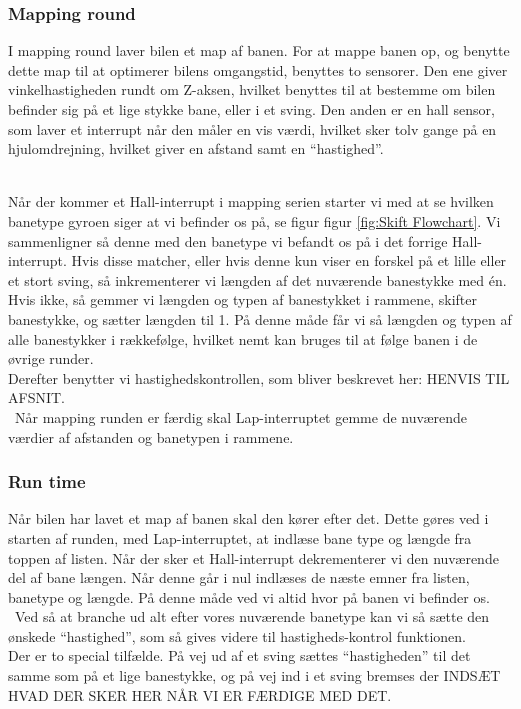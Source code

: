 \subsubsection{Mapping round}
I mapping round laver bilen et map af banen. For at mappe banen op, og benytte dette map til at optimerer bilens omgangstid, benyttes to sensorer. Den ene giver vinkelhastigheden rundt om Z-aksen, hvilket benyttes til at bestemme om bilen befinder sig på et lige stykke bane, eller i et sving. Den anden er en hall sensor, som laver et interrupt når den måler en vis værdi, hvilket sker tolv gange på en hjulomdrejning, hvilket giver en afstand samt en ``hastighed''.
\\\


Når der kommer et Hall-interrupt i mapping serien starter vi med at se hvilken banetype gyroen siger at vi befinder os på, se figur figur \ref{fig:Skift Flowchart}. Vi sammenligner så denne med den banetype vi befandt os på i det forrige Hall-interrupt. Hvis disse matcher, eller hvis denne kun viser en forskel på et lille eller et stort sving, så inkrementerer vi længden af det nuværende banestykke med én. Hvis ikke, så gemmer vi længden og typen af banestykket i rammene, skifter banestykke, og sætter længden til 1. På denne måde får vi så længden og typen af alle banestykker i rækkefølge, hvilket nemt kan bruges til at følge banen i de øvrige runder.
\\
Derefter benytter vi hastighedskontrollen, som bliver beskrevet her: HENVIS TIL AFSNIT.
\\\
Når mapping runden er færdig skal Lap-interruptet gemme de nuværende værdier af afstanden og banetypen i rammene. 

\subsubsection{Run time}

Når bilen har lavet et map af banen skal den kører efter det. Dette gøres ved i starten af runden, med Lap-interruptet, at indlæse bane type og længde fra toppen af listen. Når der sker et Hall-interrupt dekrementerer vi den nuværende del af bane længen. Når denne går i nul indlæses de næste emner fra listen, banetype og længde. På denne måde ved vi altid hvor på banen vi befinder os.
\\\
Ved så at branche ud alt efter vores nuværende banetype kan vi så sætte den ønskede ``hastighed'', som så gives videre til hastigheds-kontrol funktionen.
\\
Der er to special tilfælde. På vej ud af et sving sættes ``hastigheden'' til det samme som på et lige banestykke, og på vej ind i et sving bremses der INDSÆT HVAD DER SKER HER NÅR VI ER FÆRDIGE MED DET.